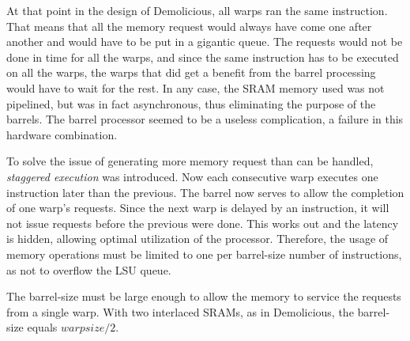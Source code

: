 \documentclass[../main/report.tex]{subfiles}
\begin{document}
At that point in the design of Demolicious, all warps ran the same instruction.
That means that all the memory request would always have come one after another and would have to be put in a gigantic queue.
The requests would not be done in time for all the warps, and since the same instruction has to be executed on all the warps, the warps that did get a benefit from the barrel processing would have to wait for the rest.
In any case, the SRAM memory used was not pipelined, but was in fact asynchronous, thus eliminating the purpose of the barrels.
The barrel processor seemed to be a useless complication, a failure in this hardware combination.

To solve the issue of generating more memory request than can be handled, \emph{staggered execution} was introduced.
Now each consecutive warp executes one instruction later than the previous.
The barrel now serves to allow the completion of one warp's requests.
Since the next warp is delayed by an instruction, it will not issue requests before the previous were done.
This works out and the latency is hidden, allowing optimal utilization of the processor.
Therefore, the usage of memory operations must be limited to one per barrel-size number of instructions, as not to overflow the LSU queue.

The barrel-size must be large enough to allow the memory to service the requests from a single warp.
With two interlaced SRAMs, as in Demolicious, the barrel-size equals $ warp size / 2 $.
\end{document}
